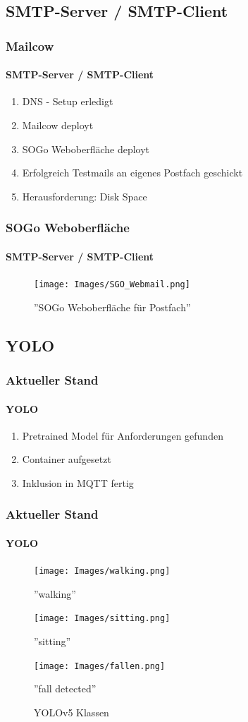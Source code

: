 \documentclass[]{beamer}
\begin{document}
\subsection{SMTP-Server / SMTP-Client}
\begin{frame}
	\frametitle{Mailcow}
	\framesubtitle{SMTP-Server / SMTP-Client}
	\begin{enumerate}
		\item DNS - Setup erledigt
		\item Mailcow deployt
		\item SOGo Weboberfläche deployt
		\item Erfolgreich Testmails an eigenes Postfach geschickt
		\item Herausforderung: Disk Space
	\end{enumerate}
\end{frame}

\begin{frame}
	\frametitle{SOGo Weboberfläche}
	\framesubtitle{SMTP-Server / SMTP-Client}
	\begin{figure}
		\begin{minipage}[t]{1\textwidth}
			\centering
			\texttt{[image: Images/SGO\_Webmail.png]}
		\end{minipage}
		\caption{''SOGo Weboberfläche für Postfach''}
	\end{figure}
\end{frame}

\subsection{YOLO}
\begin{frame}
	\frametitle{Aktueller Stand}
	\framesubtitle{YOLO}
	\begin{enumerate}
		\item Pretrained Model für Anforderungen gefunden
		\item Container aufgesetzt
		\item Inklusion in MQTT  fertig
	\end{enumerate}

\end{frame}

\begin{frame}
	\frametitle{Aktueller Stand}
	\framesubtitle{YOLO}
	\begin{figure}
		\centering
		\begin{minipage}[t]{0.3\textwidth}
			\centering
			\texttt{[image: Images/walking.png]}
			\caption*{''walking''}
		\end{minipage}
		\hfill
		\begin{minipage}[t]{0.3\textwidth}
			\centering
			\texttt{[image: Images/sitting.png]}
			\caption*{''sitting''}
		\end{minipage}
		\hfill
		\begin{minipage}[t]{0.3\textwidth}
			\centering
			\texttt{[image: Images/fallen.png]}
			\caption*{ ''fall detected''}
		\end{minipage}
		\caption{YOLOv5 Klassen}
		\label{fig:yolo_classes}
	\end{figure}

\end{frame}
\end{document}
